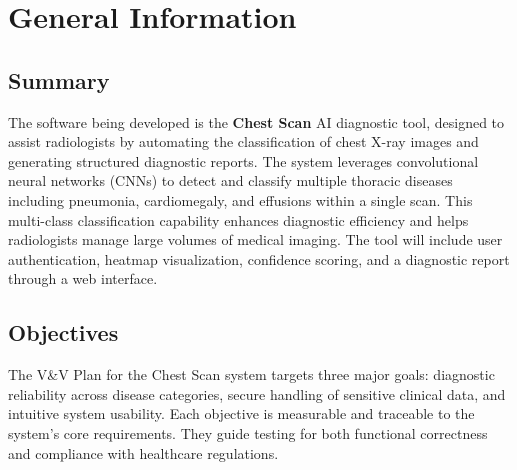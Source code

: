 \documentclass[12pt, titlepage]{article}
\begin{document}
\section{General Information}


\subsection{Summary}
The software being developed is the \textbf{Chest Scan} AI diagnostic tool, designed to assist radiologists by automating the classification of chest X-ray images and generating structured diagnostic reports. The system leverages convolutional neural networks (CNNs) to detect and classify multiple thoracic diseases including pneumonia, cardiomegaly, and effusions within a single scan. This multi-class classification capability enhances diagnostic efficiency and helps radiologists manage large volumes of medical imaging. The tool will include user authentication, heatmap visualization, confidence scoring, and a diagnostic report through a web interface.

\subsection{Objectives}
The V\&V Plan for the Chest Scan system targets three major goals: diagnostic reliability across disease categories, secure handling of sensitive clinical data, and intuitive system usability. Each objective is measurable and traceable to the system's core requirements. They guide testing for both functional correctness and compliance with healthcare regulations.
\end{document}
